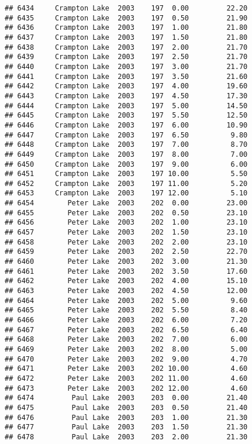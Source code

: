 \documentclass[
]{article}
\begin{document}
\begin{verbatim}
## 6434     Crampton Lake  2003    197  0.00         22.20
## 6435     Crampton Lake  2003    197  0.50         21.90
## 6436     Crampton Lake  2003    197  1.00         21.80
## 6437     Crampton Lake  2003    197  1.50         21.80
## 6438     Crampton Lake  2003    197  2.00         21.70
## 6439     Crampton Lake  2003    197  2.50         21.70
## 6440     Crampton Lake  2003    197  3.00         21.70
## 6441     Crampton Lake  2003    197  3.50         21.60
## 6442     Crampton Lake  2003    197  4.00         19.60
## 6443     Crampton Lake  2003    197  4.50         17.30
## 6444     Crampton Lake  2003    197  5.00         14.50
## 6445     Crampton Lake  2003    197  5.50         12.50
## 6446     Crampton Lake  2003    197  6.00         10.90
## 6447     Crampton Lake  2003    197  6.50          9.80
## 6448     Crampton Lake  2003    197  7.00          8.70
## 6449     Crampton Lake  2003    197  8.00          7.00
## 6450     Crampton Lake  2003    197  9.00          6.00
## 6451     Crampton Lake  2003    197 10.00          5.50
## 6452     Crampton Lake  2003    197 11.00          5.20
## 6453     Crampton Lake  2003    197 12.00          5.10
## 6454        Peter Lake  2003    202  0.00         23.00
## 6455        Peter Lake  2003    202  0.50         23.10
## 6456        Peter Lake  2003    202  1.00         23.10
## 6457        Peter Lake  2003    202  1.50         23.10
## 6458        Peter Lake  2003    202  2.00         23.10
## 6459        Peter Lake  2003    202  2.50         22.70
## 6460        Peter Lake  2003    202  3.00         21.30
## 6461        Peter Lake  2003    202  3.50         17.60
## 6462        Peter Lake  2003    202  4.00         15.10
## 6463        Peter Lake  2003    202  4.50         12.00
## 6464        Peter Lake  2003    202  5.00          9.60
## 6465        Peter Lake  2003    202  5.50          8.40
## 6466        Peter Lake  2003    202  6.00          7.20
## 6467        Peter Lake  2003    202  6.50          6.40
## 6468        Peter Lake  2003    202  7.00          6.00
## 6469        Peter Lake  2003    202  8.00          5.00
## 6470        Peter Lake  2003    202  9.00          4.70
## 6471        Peter Lake  2003    202 10.00          4.60
## 6472        Peter Lake  2003    202 11.00          4.60
## 6473        Peter Lake  2003    202 12.00          4.60
## 6474         Paul Lake  2003    203  0.00         21.40
## 6475         Paul Lake  2003    203  0.50         21.40
## 6476         Paul Lake  2003    203  1.00         21.30
## 6477         Paul Lake  2003    203  1.50         21.30
## 6478         Paul Lake  2003    203  2.00         21.30

\end{verbatim}
\end{document}
